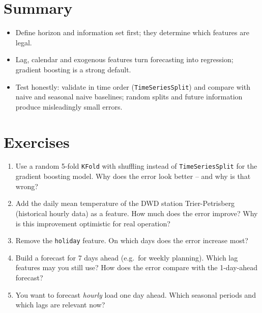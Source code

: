 \documentclass[
  letterpaper,
  DIV=11,
  numbers=noendperiod]{scrreprt}
\providecommand{\tightlist}{%
  \setlength{\itemsep}{0pt}\setlength{\parskip}{0pt}}\usepackage{longtable,booktabs,array}
\begin{document}
\section{Summary}\label{summary-11}

\begin{tcolorbox}[enhanced jigsaw, left=2mm, title=\textcolor{quarto-callout-important-color}{\faExclamation}\hspace{0.5em}{Key takeaways}, opacityback=0, breakable, rightrule=.15mm, arc=.35mm, toptitle=1mm, colbacktitle=quarto-callout-important-color!10!white, opacitybacktitle=0.6, coltitle=black, colframe=quarto-callout-important-color-frame, bottomrule=.15mm, leftrule=.75mm, bottomtitle=1mm, titlerule=0mm, toprule=.15mm, colback=white]

\begin{itemize}
\tightlist
\item
  Define horizon and information set first; they determine which
  features are legal.
\item
  Lag, calendar and exogenous features turn forecasting into regression;
  gradient boosting is a strong default.
\item
  Test honestly: validate in time order (\texttt{TimeSeriesSplit}) and
  compare with naive and seasonal naive baselines; random splits and
  future information produce misleadingly small errors.
\end{itemize}

\end{tcolorbox}

\section{Exercises}\label{exercises-11}

\begin{enumerate}
\def\labelenumi{\arabic{enumi}.}
\tightlist
\item
  Use a random 5-fold \texttt{KFold} with shuffling instead of
  \texttt{TimeSeriesSplit} for the gradient boosting model. Why does the
  error look better -- and why is that wrong?
\item
  Add the daily mean temperature of the DWD station Trier-Petrisberg
  (historical hourly data) as a feature. How much does the error
  improve? Why is this improvement optimistic for real operation?
\item
  Remove the \texttt{holiday} feature. On which days does the error
  increase most?
\item
  Build a forecast for 7 days ahead (e.g.~for weekly planning). Which
  lag features may you still use? How does the error compare with the
  1-day-ahead forecast?
\item
  You want to forecast \emph{hourly} load one day ahead. Which seasonal
  periods and which lags are relevant now?
\end{enumerate}
\end{document}
